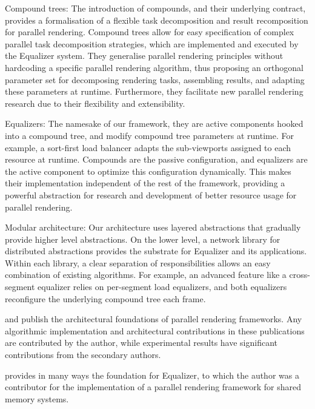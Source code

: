 \begin{compactdesc}
\item[Compound trees:] The introduction of compounds, and their underlying
contract, provides a formalisation of a flexible task decomposition and result
recomposition for parallel rendering. Compound trees allow for easy
specification of complex parallel task decomposition strategies, which are
implemented and executed by the Equalizer system. They generalise parallel
rendering principles without hardcoding a specific parallel rendering
algorithm, thus proposing an orthogonal parameter set for decomposing rendering
tasks, assembling results, and adapting these parameters at runtime.
Furthermore, they facilitate new parallel rendering research due to their
flexibility and extensibility.

\item[Equalizers:] The namesake of our framework, they are active components
hooked into a compound tree, and modify compound tree parameters at runtime.
For example, a sort-first load balancer adapts the sub-viewports assigned to
each resource at runtime. Compounds are the passive configuration, and
equalizers are the active component to optimize this configuration dynamically.
This makes their implementation independent of the rest of the framework,
providing a powerful abstraction for research and development of better
resource usage for parallel rendering.

\item[Modular architecture:] Our architecture uses layered abstractions that
gradually provide higher level abstractions. On the lower level, a network
library for distributed abstractions provides the substrate for Equalizer and its
applications. Within each library, a clear separation of responsibilities
allows an easy combination of existing algorithms. For example, an advanced feature
like a cross-segment equalizer relies on per-segment load equalizers, and
both equalizers reconfigure the underlying compound tree each frame.

\end{compactdesc}

\cite{EMP:09} and \cite{ESP:18} publish the architectural foundations of
parallel rendering frameworks. Any algorithmic implementation and
architectural contributions in these publications are contributed by the
author, while experimental results have significant contributions from the
secondary authors.

\cite{BRE:05} provides in many ways the foundation for Equalizer, to which the
author was a contributor for the implementation of a parallel rendering
framework for shared memory systems.

